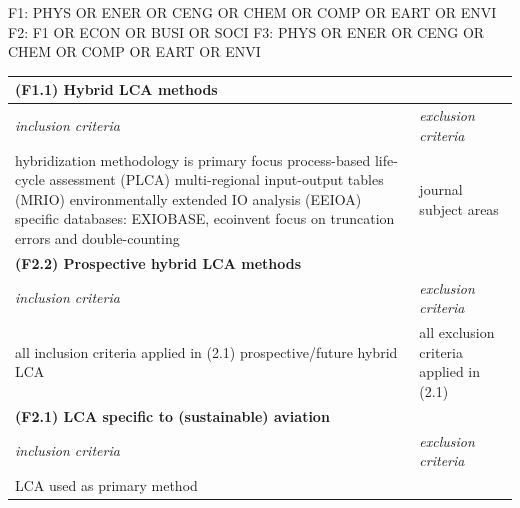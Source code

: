 \documentclass{article}
\begin{document}
\begin{code_search}
F1: PHYS OR ENER OR CENG OR CHEM OR COMP OR EART OR ENVI
F2: F1 OR ECON OR BUSI OR SOCI
F3: PHYS OR ENER OR CENG OR CHEM OR COMP OR EART OR ENVI
\end{code_search}

        
            \begin{table}[H]
                \centering
                \begin{tabularx}{\textwidth}{| X | X |}
                    \hline
                \multicolumn{2}{|l|}{\textbf{(F1.1) Hybrid LCA methods}}  \\
                    \hline
                    \textit{inclusion criteria} & \textit{exclusion criteria} \\
                    \hline
                        hybridization methodology is primary focus \newline
                        process-based life-cycle assessment (PLCA) \newline
                        multi-regional input-output tables (MRIO) \newline
                        environmentally extended IO analysis (EEIOA) \newline
                        specific databases: EXIOBASE, ecoinvent \newline
                        focus on truncation errors and double-counting
                    &
                        journal subject areas
                    \\
                    \hline
                \multicolumn{2}{|l|}{\textbf{(F2.2) Prospective hybrid LCA methods}}  \\
                    \hline
                    \textit{inclusion criteria} & \textit{exclusion criteria} \\
                    \hline
                        all inclusion criteria applied in (2.1) \newline
                        prospective/future hybrid LCA
                    &
                        all exclusion criteria applied in (2.1)
                    \\
                    \hline
                \multicolumn{2}{|l|}{\textbf{(F2.1) LCA specific to (sustainable) aviation}}  \\
                    \hline
                    \textit{inclusion criteria} & \textit{exclusion criteria} \\
                    \hline
                        LCA used as primary method  \newline

\end{tabularx}
\end{table}
\end{document}

